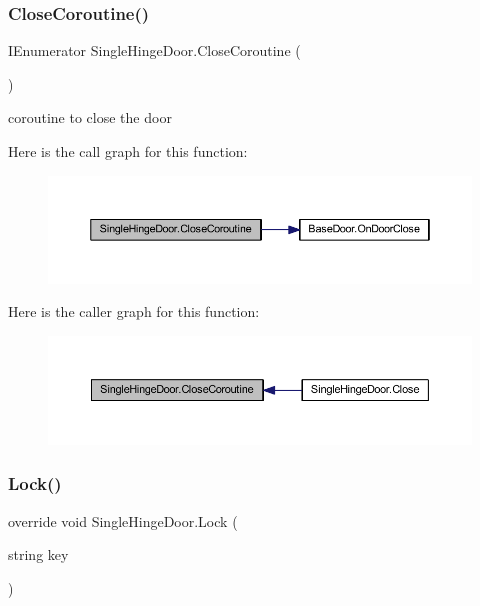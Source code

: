 \subsubsection{\texorpdfstring{Close\+Coroutine()}{CloseCoroutine()}}
{\footnotesize\ttfamily I\+Enumerator Single\+Hinge\+Door.\+Close\+Coroutine (\begin{DoxyParamCaption}{ }\end{DoxyParamCaption})\hspace{0.3cm}{\ttfamily [private]}}



coroutine to close the door 

Here is the call graph for this function\+:
\nopagebreak
\begin{figure}[H]
\begin{center}
\leavevmode
\includegraphics[width=350pt]{class_single_hinge_door_a6b1760cbc6ac5ed4c0e9d7ecb10d2606_cgraph}
\end{center}
\end{figure}
Here is the caller graph for this function\+:
\nopagebreak
\begin{figure}[H]
\begin{center}
\leavevmode
\includegraphics[width=350pt]{class_single_hinge_door_a6b1760cbc6ac5ed4c0e9d7ecb10d2606_icgraph}
\end{center}
\end{figure}
\mbox{\label{class_single_hinge_door_a329ff33388675ec531996bdb33dd0c70}} 
\subsubsection{\texorpdfstring{Lock()}{Lock()}}
{\footnotesize\ttfamily override void Single\+Hinge\+Door.\+Lock (\begin{DoxyParamCaption}\item[{string}]{key }\end{DoxyParamCaption})\hspace{0.3cm}{\ttfamily [virtual]}}



